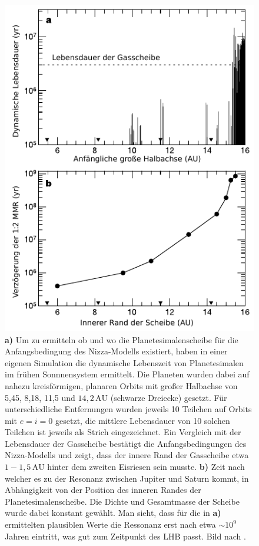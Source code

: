 \documentclass[12pt,a4paper,twoside]{article}
\newcommand{\AU}{\,\mathrm{AU}}
\begin{document}
\begin{figure}[tbn]
\centering
\includegraphics[scale=1]{img/Gomes2005-1.pdf}
\caption{\textbf{a)} Um zu ermitteln ob und wo die Planetesimalenscheibe für die Anfangsbedingung des Nizza-Modells existiert, haben \cite{Gomes2005} in einer eigenen Simulation die dynamische Lebenszeit von Planetesimalen im frühen Sonnnensystem ermittelt. Die Planeten wurden dabei auf nahezu kreisförmigen, planaren Orbits mit großer Halbachse von 5,45, 8,18, 11,5 und $14,2 \AU$ (schwarze Dreiecke) gesetzt. Für unterschiedliche Entfernungen wurden jeweils 10 Teilchen auf Orbits mit $e=i=0$ gesetzt, die mittlere Lebensdauer von 10 solchen Teilchen ist jeweils als Strich eingezeichnet. Ein Vergleich mit der Lebensdauer der Gasscheibe bestätigt die Anfangsbedingungen des Nizza-Modells und zeigt, dass der innere Rand der Gasscheibe etwa $1-1,5 \AU$ hinter dem zweiten Eisriesen sein musste.
\textbf{b)} Zeit nach welcher es zu der Resonanz zwischen Jupiter und Saturn kommt, in Abhängigkeit von der Position des inneren Randes der Planetesimalenscheibe. Die Dichte und Gesamtmasse der Scheibe wurde dabei konstant gewählt. Man sieht, dass für die in {\textbf{a)}} ermittelten plausiblen Werte die Ressonanz erst nach etwa $\sim10^9$ Jahren eintritt, was gut zum Zeitpunkt des LHB passt. Bild nach \cite{Gomes2005}.}
\label{fig:LHBtiming}
\end{figure} %
\end{document}
